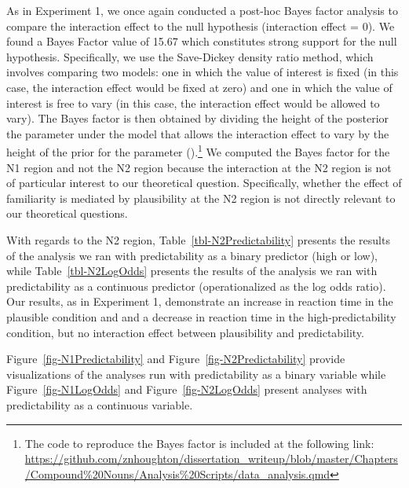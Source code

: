 \documentclass[
  12pt,
  letterpaper,
]{scrreprt}
\begin{document}
As in Experiment 1, we once again conducted a post-hoc Bayes factor
analysis to compare the interaction effect to the null hypothesis
(interaction effect = 0). We found a Bayes Factor value of 15.67 which
constitutes strong support for the null hypothesis. Specifically, we use
the Save-Dickey density ratio method, which involves comparing two
models: one in which the value of interest is fixed (in this case, the
interaction effect would be fixed at zero) and one in which the value of
interest is free to vary (in this case, the interaction effect would be
allowed to vary). The Bayes factor is then obtained by dividing the
height of the posterior the parameter under the model that allows the
interaction effect to vary by the height of the prior for the parameter
().\footnote{The code to reproduce the Bayes factor is included
  at the following link:
  \url{https://github.com/znhoughton/dissertation_writeup/blob/master/Chapters/Compound\%20Nouns/Analysis\%20Scripts/data_analysis.qmd}}
We computed the Bayes factor for the N1 region and not the N2 region
because the interaction at the N2 region is not of particular interest
to our theoretical question. Specifically, whether the effect of
familiarity is mediated by plausibility at the N2 region is not directly
relevant to our theoretical questions.

With regards to the N2 region, Table~\ref{tbl-N2Predictability} presents
the results of the analysis we ran with predictability as a binary
predictor (high or low), while Table~\ref{tbl-N2LogOdds} presents the
results of the analysis we ran with predictability as a continuous
predictor (operationalized as the log odds ratio). Our results, as in
Experiment 1, demonstrate an increase in reaction time in the plausible
condition and and a decrease in reaction time in the high-predictability
condition, but no interaction effect between plausibility and
predictability.

Figure~\ref{fig-N1Predictability} and Figure~\ref{fig-N2Predictability}
provide visualizations of the analyses run with predictability as a
binary variable while Figure~\ref{fig-N1LogOdds} and
Figure~\ref{fig-N2LogOdds} present analyses with predictability as a
continuous variable.
\end{document}
